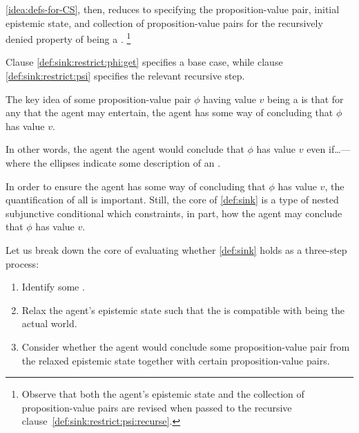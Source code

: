\begin{note}
  \autoref{idea:defs-for-CS}, then, reduces to specifying the proposition-value pair, initial epistemic state, and collection of proposition-value pairs for the recursively denied property of being a \sink{}.\nolinebreak
  \footnote{
    Observe that both the agent's epistemic state and the collection of proposition-value pairs are revised when passed to the recursive clause~\ref{def:sink:restrict:psi:recurse}.
  }

  Clause \ref{def:sink:restrict:phi:get} specifies a base case, while clause \ref{def:sink:restrict:psi} specifies the relevant recursive step.
\end{note}

\begin{note}
  The key idea of some proposition-value pair \(\phi\) having value \(v\) being a \sink{} is that for any \epN{} \world{} that the agent may entertain, the agent has some way of concluding that \(\phi\) has value \(v\).

  In other words, the agent the agent would conclude that \(\phi\) has value \(v\) even if\dots\space --- where the ellipses indicate some description of an \epN{} \world{}.
\end{note}

\begin{note}
  In order to ensure the agent has some way of concluding that \(\phi\) has value \(v\), the quantification of all \epN{}  is important.
  Still, the core of \autoref{def:sink} is a type of nested subjunctive conditional which constraints, in part, how the agent may conclude that \(\phi\) has value \(v\).

  Let us break down the core of evaluating whether \autoref{def:sink} holds as a three-step process:
  \begin{enumerate}[label=\Alph*., ref=\Alph*]
  \item
    \label{ideaCSA:sink:step:A}
    Identify some \epN{} \world{}.
  \item
    \label{ideaCSA:sink:step:B}
    Relax the agent's epistemic state such that the \epN{} \world{} is compatible with being the actual world.
  \item
    \label{ideaCSA:sink:step:C}
    Consider whether the agent would conclude some proposition-value pair from the relaxed epistemic state together with certain proposition-value pairs.
  \end{enumerate}
\end{note}

